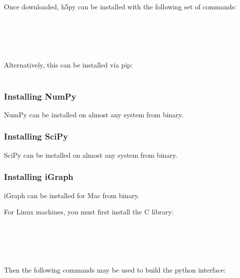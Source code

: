 Once downloaded, h5py can be installed with the following set of commands:\\

 \\
 \\
 \\
 \\
 \\

Alternatively, this can be installed via pip:\\

\\

\subsubsection{Installing NumPy}

NumPy can be installed on almost any system from binary.

\subsubsection{Installing SciPy}

SciPy can be installed on almost any system from binary.

\subsubsection{Installing iGraph}

iGraph can be installed for Mac from binary.  

\noindent For Linux machines, you must first install the C library: \\

 \\
 \\
 \\
 \\
 \\


\noindent Then the following commands may be used to build the python interface: \\

